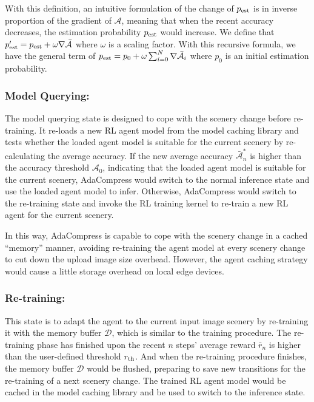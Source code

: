 With this definition, an intuitive formulation of the change of $ p_{\rm est} $ is in inverse proportion of the gradient of $ \mathcal{A} $, meaning that when the recent accuracy decreases, the estimation probability $ p_{\rm est} $ would increase. We define that $ p'_{\rm est} = p_{\rm est} + \omega \nabla \bar{\mathcal{A}} $ where $ \omega $ is a scaling factor. With this recursive formula, we have the general term of $p_{\rm est} = p_0 + \omega \sum_{i=0}^{N} \nabla \bar{\mathcal{A}_i} $ where $ p_0 $ is an initial estimation probability.

\subsubsection{Model Querying:}

The model querying state is designed to cope with the scenery change before re-training. It re-loads a new RL agent model from the model caching library and tests whether the loaded agent model is suitable for the current scenery by re-calculating the average accuracy. If the new average accuracy $ \bar{\mathcal{A}}^*_n $ is higher than the accuracy threshold $ \mathcal{A}_0 $, indicating that the loaded agent model is suitable for the current scenery, AdaCompress would switch to the normal inference state and use the loaded agent model to infer. Otherwise, AdaCompress would switch to the re-training state and invoke the RL training kernel to re-train a new RL agent for the current scenery.

In this way, AdaCompress is capable to cope with the scenery change in a cached ``memory'' manner, avoiding re-training the agent model at every scenery change to cut down the upload image size overhead. However, the agent caching strategy would cause a little storage overhead on local edge devices.


\subsubsection{Re-training:}

This state is to adapt the agent to the current input image scenery by re-training it with the memory buffer $ \mathcal{D} $, which is similar to the training procedure. The re-training phase has finished upon the recent $ n $ steps' average reward $ \bar{r}_n $ is higher than the user-defined threshold $ r_{\rm th} $. And when the re-training procedure finishes, the memory buffer $ \mathcal{D} $ would be flushed, preparing to save new transitions for the re-training of a next scenery change. The trained RL agent model would be cached in the model caching library and be used to switch to the inference state.

